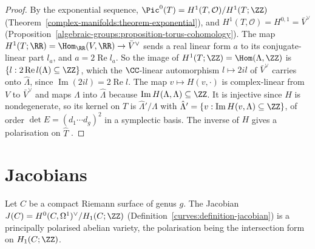 \begin{proof}
By the exponential sequence, $\Pic^0(T) = H^1(T, \mathcal{O})/H^1(T; \ZZ)$ (Theorem~\ref{complex-manifolds:theorem-exponential}), and $H^1(T, \mathcal{O}) = H^{0,1} = \bar V^\vee$
(Proposition~\ref{algebraic-groups:proposition-torus-cohomology}). The map $H^1(T; \RR) = \Hom_\RR(V, \RR) \to \bar V^\vee$ sends a real linear form $a$ to its conjugate-linear part
$l_a$, and $a = 2\operatorname{Re}l_a$. So the image of $H^1(T; \ZZ) = \Hom(\Lambda, \ZZ)$ is $\{l : 2\operatorname{Re}l(\Lambda) \subseteq \ZZ\}$, which the $\CC$-linear automorphism
$l \mapsto 2il$ of $\bar V^\vee$ carries onto $\hat\Lambda$, since $\operatorname{Im}(2il) = 2\operatorname{Re}l$. The map
$v \mapsto H(v, \cdot)$ is complex-linear from $V$ to $\bar V^\vee$ and maps $\Lambda$ into $\hat\Lambda$ because $\operatorname{Im}H(\Lambda, \Lambda) \subseteq \ZZ$. It is injective since
$H$ is nondegenerate, so its kernel on $T$ is $\hat\Lambda'/\Lambda$ with $\hat\Lambda' = \{v : \operatorname{Im}H(v, \Lambda) \subseteq \ZZ\}$, of order $\det E = (d_1 \cdots d_g)^2$ in
a symplectic basis. The inverse of $H$ gives a polarisation on $\hat T$ \cite{birkenhake-lange}.
\end{proof}

\section{Jacobians}\label{algebraic-groups:section-jacobians}

\begin{theorem}\label{algebraic-groups:theorem-jacobian}
Let $C$ be a compact Riemann surface of genus $g$. The Jacobian $J(C) = H^0(C, \Omega^1)^\vee/H_1(C; \ZZ)$ (Definition~\ref{curves:definition-jacobian}) is a principally
polarised abelian variety, the polarisation being the intersection form on $H_1(C; \ZZ)$.
\end{theorem}

